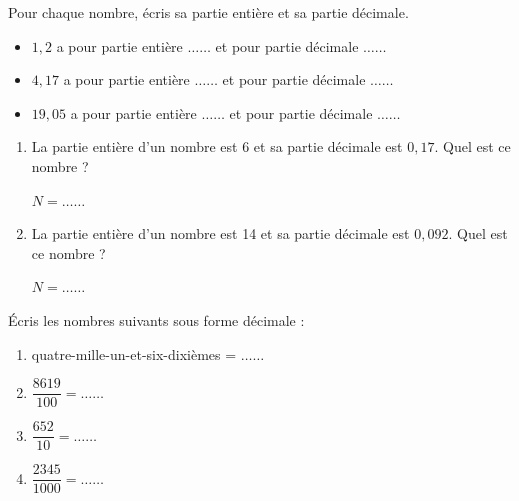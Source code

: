 \begin{pageAD} 



Pour chaque nombre, écris sa partie entière et sa partie décimale.

\begin{itemize}
\item  $1,2$ a pour partie entière $\ldots \ldots $ et pour partie décimale $\ldots \ldots $ 
\item  $4,17$ a pour partie entière $\ldots \ldots $ et pour partie décimale $\ldots \ldots $ 
\item  $19,05$ a pour partie entière $\ldots \ldots $ et pour partie décimale $\ldots \ldots $ 
\end{itemize}



\begin{enumerate}

\item  La partie entière d'un nombre est 6 et sa partie décimale est $0,17$. Quel est ce nombre ?

$N =  \ldots \ldots $ 


\item  La partie entière d'un nombre est 14 et sa partie décimale est $0,092$. Quel est ce nombre ?

$N = \ldots \ldots $ 
\end{enumerate}


\begin{minipage}{0.58\linewidth}



 Écris les nombres suivants sous forme décimale :
 \begin{enumerate}
 \item quatre-mille-un-et-six-dixièmes = $\ldots \ldots $ \vspace{0.2cm}
 \item $\dfrac{8619}{100}  =  \ldots \ldots $ \vspace{0.2cm}
 \item $\dfrac{652}{10}  =  \ldots \ldots $ \vspace{0.2cm}
 \item $\dfrac{2345}{1000}  =  \ldots \ldots $
 \end{enumerate}
 
\end{minipage}
\begin{minipage}{0.38\linewidth}



\end{minipage}
\end{pageAD}
